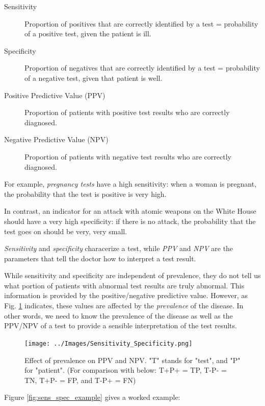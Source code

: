 \begin{description}
  \item[Sensitivity] Proportion of positives that are correctly identified by a test = probability of a positive test, given the patient is ill.
  \item[Specificity] Proportion of negatives that are correctly identified by a test = probability of a negative test, given that patient is well.
  \item[Positive Predictive Value (PPV)] Proportion of patients with positive test results who are correctly diagnosed.
  \item[Negative Predictive Value (NPV)] Proportion of patients with negative test results who are correctly diagnosed.
\end{description}

For example, \emph{pregnancy tests} have a high sensitivity: when a woman is pregnant, the probability that the test is positive is very high.

In contrast, an indicator for an attack with atomic weapons on the White House should have a very high specificity: if there is no attack, the probability that the test goes on should be very, very small.

\emph{Sensitivity} and \emph{specificity} characerize a test, while \emph{PPV} and \emph{NPV} are the parameters that tell the doctor how to interpret a test result.

While sensitivity and specificity are independent of prevalence, they do not tell us what portion of patients with abnormal test results are truly abnormal. This information is provided by the positive/negative predictive value. However, as Fig. \ref{fig:prevalence} indicates, these values are affected by the \emph{prevalence}  of the disease. In other words, we need to know the prevalence of the disease as well as the PPV/NPV of a test to provide a sensible interpretation of the test results.

\begin{figure}[ht]
  \centering
  \texttt{[image: ../Images/Sensitivity\_Specificity.png]}\\
  \caption{Effect of prevalence on PPV and NPV. "T" stands for "test", and "P" for "patient". (For comparison with below: T+P+ = TP, T-P- = TN, T+P- = FP, and T-P+ = FN)} \label{fig:prevalence}
\end{figure}

Figure \ref{fig:sens_spec_example} gives a worked example:

